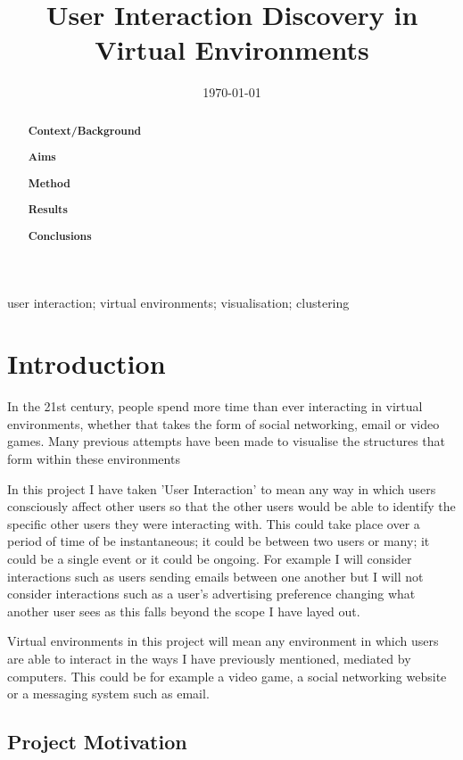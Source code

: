 \documentclass[12pt,a4paper]{article}
\title{User Interaction Discovery in Virtual Environments}
\date{\today}
\begin{document}
\maketitle

\begin{abstract}

{\bf Context/Background}

{\bf Aims}

{\bf Method}

{\bf Results}

{\bf Conclusions}

\end{abstract}

\begin{keywords}
user interaction; virtual environments; visualisation; clustering
\end{keywords}

\section{Introduction}

In the 21st century, people spend more time than ever interacting in virtual environments, whether that takes the form of social networking, email or video games. Many previous attempts have been made to visualise the structures that form within these environments \cite{freeman2000visualizing}

In this project I have taken 'User Interaction' to mean any way in which users consciously affect other users so that the other users would be able to identify the specific other users they were interacting with. This could take place over a period of time of be instantaneous; it could be between two users or many; it could be a single event or it could be ongoing. For example I will consider interactions such as users sending emails between one another but I will not consider interactions such as a user's advertising preference changing what another user sees as this falls beyond the scope I have layed out.

Virtual environments in this project will mean any environment in which users are able to interact in the ways I have previously mentioned, mediated by computers. This could be for example a video game, a social networking website or a messaging system such as email.

\subsection{Project Motivation}
\end{document}
